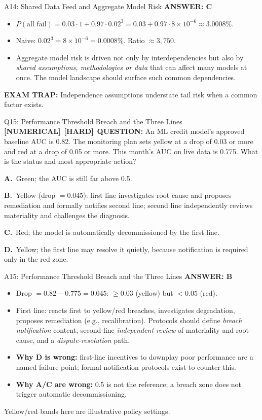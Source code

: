 \documentclass[8pt]{beamer}
\newcommand{\fs}{\fontsize{10}{12}\selectfont}
\newcommand{\opts}[4]{\par\vspace{0.12cm}\noindent\textbf{A.}~#1\par\vspace{0.08cm}\noindent\textbf{B.}~#2\par\vspace{0.08cm}\noindent\textbf{C.}~#3\par\vspace{0.08cm}\noindent\textbf{D.}~#4\par}
\newcommand{\ans}[1]{\textcolor{myblue}{\textbf{ANSWER: #1}}}
\newcommand{\trap}[1]{\textcolor{myred}{\textbf{EXAM TRAP:}} #1}
\newcommand{\numtag}{\textcolor{mypurple}{\textbf{[NUMERICAL]}}}
\newcommand{\hard}{\textcolor{myorange}{\textbf{[HARD]}}}
\begin{document}
\begin{frame}[t]{A14: Shared Data Feed and Aggregate Model Risk}
\fs
\ans{C}
\begin{itemize}
\item $P(\text{all fail})=0.03\cdot1+0.97\cdot0.02^3=0.03+0.97\cdot8\times10^{-6}\approx\mathbf{3.0008\%}$.
\item Naive: $0.02^3=8\times10^{-6}=0.0008\%$. Ratio $\approx3{,}750$.
\item Aggregate model risk is driven not only by interdependencies but also by \emph{shared assumptions, methodologies or data} that can affect many models at once. The model landscape should surface such common dependencies.
\end{itemize}
\trap{Independence assumptions understate tail risk when a \textcolor{myblue}{common factor} exists.}
\end{frame}

\begin{frame}[t]{Q15: Performance Threshold Breach and the Three Lines}
\fs
\numtag\ \hard\ \textbf{QUESTION:} An ML credit model's approved baseline AUC is 0.82. The monitoring plan sets yellow at a drop of 0.03 or more and red at a drop of 0.05 or more. This month's AUC on live data is 0.775. What is the status and most appropriate action?
\opts{Green; the AUC is still far above 0.5.}
{Yellow (drop $=0.045$): first line investigates root cause and proposes remediation and formally notifies second line; second line independently reviews materiality and challenges the diagnosis.}
{Red; the model is automatically decommissioned by the first line.}
{Yellow; the first line may resolve it quietly, because notification is required only in the red zone.}
\end{frame}

\begin{frame}[t]{A15: Performance Threshold Breach and the Three Lines}
\fs
\ans{B}
\begin{itemize}
\item Drop $=0.82-0.775=0.045$: $\ge0.03$ (yellow) but $<0.05$ (red).
\item First line: reacts first to yellow/red breaches, investigates degradation, proposes remediation (e.g., recalibration). Protocols should define \emph{breach notification} content, second-line \emph{independent review} of materiality and root-cause, and a \emph{dispute-resolution} path.
\item \textbf{Why D is wrong:} first-line incentives to downplay poor performance are a named failure point; formal notification protocols exist to counter this.
\item \textbf{Why A/C are wrong:} 0.5 is not the reference; a breach zone does not trigger automatic decommissioning.
\end{itemize}
\textcolor{mygray}{Yellow/red bands here are illustrative policy settings.}
\end{frame}
\end{document}
